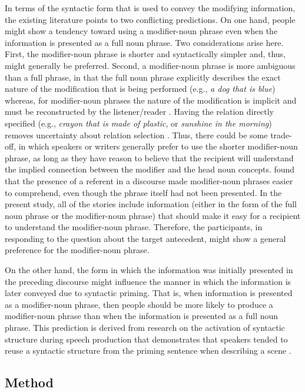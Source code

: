 \documentclass[output=paper]{langsci/langscibook}
\begin{document}
In terms of the syntactic form that is used to convey the modifying
information, the existing literature points to two conflicting
predictions. On one hand, people might show a tendency toward using a
modifier-noun phrase even when the information is presented as a full
noun phrase. Two considerations arise here. First, the modifier-noun
phrase is shorter and syntactically simpler and, thus, might generally
be preferred. Second, a modifier-noun phrase is more ambiguous than a
full phrase, in that the full noun phrase explicitly describes the
exact nature of the modification that is being performed (e.g., \textit{a dog
that is blue}) whereas, for modifier-noun phrases the nature of the
modification is implicit and must be reconstructed by the
listener/reader \citep{downing1977creation,levi1978syntax}. Having the
relation directly specified (e.g., \textit{crayon that is made of
  plastic}, or \textit{sunshine in the morning}) removes uncertainty
about relation selection
\citep{gagne2014conceptual,gagne2015semantics}. Thus, there could be
some trade-off, in which speakers or writers generally prefer to use
the shorter modifier-noun phrase, as long as they have reason to
believe that the recipient will understand the implied connection
between the modifier and the head noun
concepts. \citet{gagne2004effect} found that the presence of a
referent in a discourse made modifier-noun phrases easier to
comprehend, even though the phrase itself had not been presented. In
the present study, all of the stories include information (either in
the form of the full noun phrase or the modifier-noun phrase) that
should make it easy for a recipient to understand the modifier-noun
phrase. Therefore, the participants, in responding to the question
about the target antecedent, might show a general preference for the
modifier-noun phrase.

On the other hand, the form in which the information was initially
presented in the preceding discourse might influence the manner in
which the information is later conveyed due to syntactic priming. That
is, when information is presented as a modifier-noun phrase, then
people should be more likely to produce a modifier-noun phrase than
when the information is presented as a full noun phrase. This
prediction is derived from research on the activation of syntactic
structure during speech production that demonstrates that speakers
tended to reuse a syntactic structure from the priming sentence when
describing a scene \citep{bock1986syntactic,bock1990framing}.

\subsection{Method}
\end{document}
